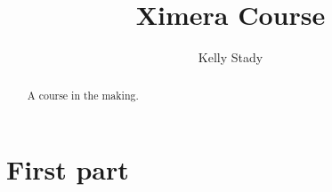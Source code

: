 \documentclass{xourse}
\title{Ximera Course}
\author{Kelly Stady}
\begin{document}
\begin{abstract}
    A course in the making. 
\end{abstract}
\maketitle

\part{First part}

\end{document}
